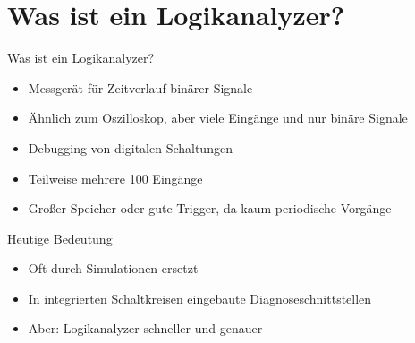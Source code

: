 \section{Was ist ein Logikanalyzer?}
\begin{frame}[<+->]{Was ist ein Logikanalyzer?}
    \begin{itemize}
        \item Messgerät für Zeitverlauf binärer Signale
        \item Ähnlich zum Oszilloskop, aber viele Eingänge und nur binäre Signale
        \item Debugging von digitalen Schaltungen
        \item Teilweise mehrere 100 Eingänge
        \item Großer Speicher oder gute Trigger, da kaum periodische Vorgänge
    \end{itemize}
\end{frame}
\begin{frame}[<+->]{Heutige Bedeutung}
    \begin{itemize}
        \item Oft durch Simulationen ersetzt
        \item In integrierten Schaltkreisen eingebaute Diagnoseschnittstellen
        \item Aber: Logikanalyzer schneller und genauer
    \end{itemize}
\end{frame}
